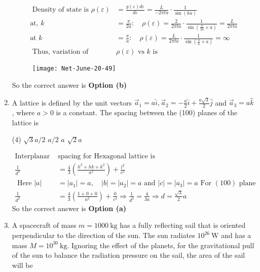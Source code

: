 \begin{enumerate}
\begin{answer}
\begin{align*}
\text{	Density of state is } \rho(\varepsilon)&=\frac{g(\varepsilon) d \varepsilon}{d \varepsilon}=\frac{L}{-2 \pi t a} \cdot \frac{1}{\sin (k a)}\\
\text{at, }k&=\frac{\pi}{2 a}: \quad \rho(\varepsilon)=\frac{2}{2 \pi t a} \cdot \frac{1}{\sin \left(\frac{\pi}{2 a} \times a\right)}=\frac{L}{2 \pi t a}\\
\text{at }k&=\frac{\pi}{a}: \quad \rho(\varepsilon)=\frac{L}{2 \pi t a} \cdot \frac{1}{\sin \left(\frac{\pi}{a} \times a\right)}=\infty\\
\text { Thus, variation of } &\rho(\varepsilon) \text { vs } k \text { is }
	\end{align*}
	\begin{figure}[H]
		\centering
		\texttt{[image: Net-June-20-49]}
	\end{figure}
		So the correct answer is \textbf{Option (b)}
\end{answer}
\item A lattice is defined by the unit vectors $\vec{a}_{1}=a \hat{i}, \vec{a}_{2}=-\frac{a}{2} \hat{i}+\frac{a \sqrt{3}}{2} \hat{j}$ and $\vec{a}_{3}=a \hat{k}$, where $a>0$ is a constant. The spacing between the (100) planes of the lattice is
 \begin{tasks}(4)
	\task[\textbf{a.}] $\sqrt{3} a / 2$
	\task[\textbf{b.}]$a / 2$
	\task[\textbf{c.}] $a$
	\task[\textbf{d.}] $\sqrt{2} a$
\end{tasks}
\begin{answer}
	\begin{align*}
	\text{Interplanar  }&\text{spacing for Hexagonal lattice is}\\
	\frac{1}{d^{2}}&=\frac{4}{3}\left(\frac{h^{2}+h k+k^{2}}{a^{2}}\right)+\frac{l^{2}}{c^{2}}\\
\text{	Here }|a|&=\left|a_{1}\right|=a, \quad|b|=\left|a_{2}\right|=a\text{ and }|c|=\left|a_{3}\right|=a\text{ For $(100)$ plane}\\
	\frac{1}{d^{2}}&=\frac{4}{3}\left(\frac{1+0+0}{a^{2}}\right)+\frac{0}{c^{2}} \Rightarrow \frac{1}{d^{2}}=\frac{4}{3 a} \Rightarrow d=\frac{\sqrt{3}}{2} a
	\end{align*}
	So the correct answer is \textbf{Option (a)}
\end{answer}
\item  A spacecraft of mass $m=1000 \mathrm{~kg}$ has a fully reflecting sail that is oriented perpendicular to the direction of the sun. The sun radiates $10^{26} \mathrm{~W}$ and has a mass $M=10^{30} \mathrm{~kg}$. Ignoring the effect of the planets, for the gravitational pull of the sun to balance the radiation pressure on the sail, the area of the sail will be

\end{enumerate}
